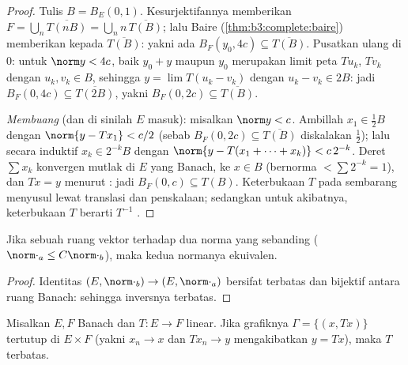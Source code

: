 \begin{proof}
Tulis $B = B_E(0,1)$. Kesurjektifannya memberikan $F = \bigcup_n
\overline{T(nB)} = \bigcup_n n\,\overline{T(B)}$; lalu Baire
(\cref{thm:b3:complete:baire}) memberikan  kepada
$\overline{T(B)}$: yakni ada $B_F(y_0, 4c) \subseteq
\overline{T(B)}$. Pusatkan ulang di $0$: untuk $\norm y < 4c$, baik
$y_0 + y$ maupun $y_0$ merupakan limit peta $Tu_k$, $Tv_k$ dengan
$u_k, v_k \in B$, sehingga $y = \lim T(u_k - v_k)$ dengan $u_k - v_k
\in 2B$: jadi $B_F(0, 4c) \subseteq \overline{T(2B)}$, yakni
$B_F(0, 2c) \subseteq \overline{T(B)}$.

\emph{Membuang } (dan di sinilah  $E$ masuk):
misalkan $\norm y < c$. Ambillah $x_1 \in \frac12 B$ dengan $\norm{y -
Tx_1} < c/2$ (sebab $B_F(0,2c) \subseteq \overline{T(B)}$ diskalakan
$\frac12$); lalu secara induktif $x_k \in 2^{-k}B$ dengan $\norm{y -
T(x_1 + \dots + x_k)} < c\,2^{-k}$. Deret $\sum x_k$
konvergen mutlak di $E$ yang Banach, ke $x \in B$ (bernorma $<
\sum 2^{-k} = 1$), dan $Tx = y$ menurut : jadi $B_F(0, c)
\subseteq T(B)$. Keterbukaan $T$ pada  sembarang menyusul lewat
translasi dan penskalaan; sedangkan untuk akibatnya, keterbukaan $T$
berarti $T^{-1}$ .
\end{proof}

\begin{corollary}\label{cor:b3:banach:equivnorms}
Jika sebuah ruang vektor  terhadap dua norma yang sebanding
($\norm\cdot_a \leq C\norm\cdot_b$), maka kedua normanya ekuivalen.
\end{corollary}

\begin{proof}
Identitas $(E, \norm\cdot_b) \to (E, \norm\cdot_a)$ bersifat
terbatas dan bijektif antara ruang Banach: sehingga inversnya
terbatas.
\end{proof}

\begin{theorem}\label{thm:b3:banach:closedgraph}
Misalkan $E, F$ Banach dan $T \colon E \to F$ linear. Jika
grafiknya $\Gamma = \{(x, Tx)\}$ tertutup di $E \times F$ (yakni
$x_n \to x$ dan $Tx_n \to y$ mengakibatkan $y = Tx$), maka $T$
terbatas.
\end{theorem}


